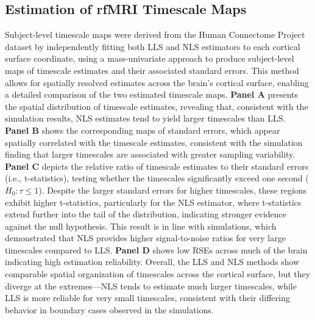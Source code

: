 \documentclass[latex/main.tex]{subfiles}
\begin{document}
\subsection{Estimation of rfMRI Timescale Maps}
Subject-level timescale maps were derived from the Human Connectome Project dataset by independently fitting both LLS and NLS estimators to each cortical surface coordinate, using a mass-univariate approach to produce subject-level maps of timescale estimates and their associated standard errors. This method allows for spatially resolved estimates across the brain's cortical surface, enabling a detailed comparison of the two estimated timescale maps. \textbf{Panel A} presents the spatial distribution of timescale estimates, revealing that, consistent with the simulation results, NLS estimates tend to yield larger timescales than LLS. \textbf{Panel B} shows the corresponding maps of standard errors, which appear spatially correlated with the timescale estimates, consistent with the simulation finding that larger timescales are associated with greater sampling variability. \textbf{Panel C} depicts the relative ratio of timescale estimates to their standard errors (i.e., t-statistics), testing whether the timescales significantly exceed one second ($H_0: \tau \leq 1$). Despite the larger standard errors for higher timescales, these regions exhibit higher t-statistics, particularly for the NLS estimator, where t-statistics extend further into the tail of the distribution, indicating stronger evidence against the null hypothesis. This result is in line with simulations, which demonstrated that NLS provides higher signal-to-noise ratios for very large timescales compared to LLS. \textbf{Panel D} shows low RSEs across much of the brain indicating high estimation reliability. Overall, the LLS and NLS methods show comparable spatial organization of timescales across the cortical surface, but they diverge at the extremes—NLS tends to estimate much larger timescales, while LLS is more reliable for very small timescales, consistent with their differing behavior in boundary cases observed in the simulations.\\
\end{document}
